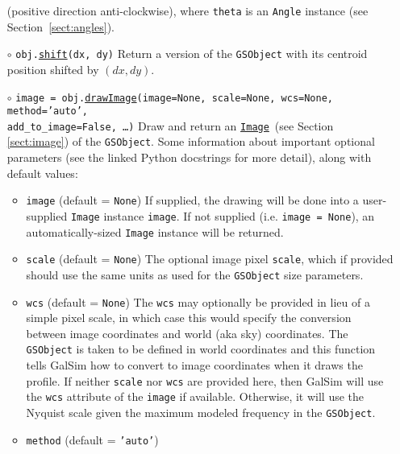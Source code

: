 \documentclass[preprint,10pt]{../../devel/modules/aastex}
\newcommand\drawImage{\href{http://galsim-developers.github.io/GalSim/classgalsim_1_1base_1_1_g_s_object.html\#aafe6ca9d84fe81543fbc105b897273db}{\texttt{drawImage}}}
\newcommand\Image{\href{http://galsim-developers.github.io/GalSim/classgalsim_1_1image_1_1_image.html}{\texttt{Image}}}
\begin{document}
\begin{itemize}
    (positive direction anti-clockwise), where \texttt{theta} is an
    \texttt{Angle} instance (see Section~\ref{sect:angles}).
  \item[$\circ$]
  \texttt{obj.}\href{http://galsim-developers.github.io/GalSim/classgalsim_1_1base_1_1_g_s_object.html#a17a4998b3d8ba6e13e9f0779e56f3697}{\texttt{shift}}\texttt{(dx, dy)}
    \newline
    Return a version of the \texttt{GSObject} with its centroid position shifted by $(dx, dy)$.
  \item[$\circ$]
  \texttt{image = obj.}\drawImage\texttt{(image=None, scale=None, wcs=None, method='auto', \\
  \phantom{image = obj.drawImage(}add\_to\_image=False, \dots)}
    \newline
    Draw and return an \Image\ (see Section \ref{sect:image}) of the \texttt{GSObject}.
    Some information about important optional parameters (see the
    linked Python docstrings for more detail), along with default values:
    \begin{itemize}
    \item \texttt{image} (default = \texttt{None}) \newline
      If supplied, the drawing will be done into a user-supplied
      \texttt{Image} instance \texttt{image}.  If not supplied
      (i.e. \texttt{image = None}), an
      automatically-sized \texttt{Image} instance will be returned.
    \item \texttt{scale} (default = \texttt{None}) \newline
      The optional image pixel \texttt{scale}, which if provided
      should use the same units as used for the \texttt{GSObject} size
      parameters.
    \item \texttt{wcs} (default = \texttt{None}) \newline
      The \texttt{wcs} may optionally be provided in lieu of a simple pixel scale,
      in which case this would specify the conversion between image
      coordinates and world (aka sky) coordinates.  The \texttt{GSObject}
      is taken to be defined in world coordinates and this function tells
      GalSim how to convert to image coordinates when it draws the profile.
      If neither \texttt{scale} nor \texttt{wcs} are provided here, then GalSim will
      use the \texttt{wcs} attribute of the \texttt{image} if available.
      Otherwise, it will use the Nyquist scale given the
      maximum modeled frequency in the \texttt{GSObject}.
    \item \texttt{method} (default = \texttt{'auto'})

\end{itemize}
\end{itemize}
\end{document}
